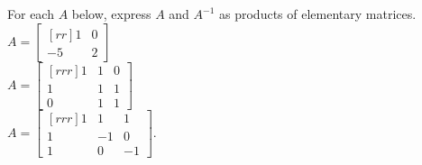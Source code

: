 \ii For each $A$ below, express $A$ and $A^{-1}$ as products of elementary matrices.
\vspace{.1in} \\
\bb
\ii $A=\begin{bmatrix}[rr]
1&0\\-5&2
\end{bmatrix}$
\vspace{.1in} \\
\ii $A=\begin{bmatrix}[rrr]
1&1&0\\
1&1&1\\
0&1&1
\end{bmatrix}$
\vspace{.1in} \\
\ii $A=\begin{bmatrix}[rrr] 1&1&1\\ 1&-1&0\\ 1&0&-1\end{bmatrix}$. 

